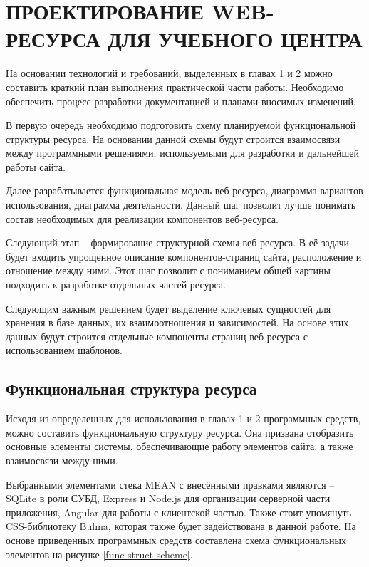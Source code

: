 \section{ПРОЕКТИРОВАНИЕ WEB-РЕСУРСА ДЛЯ УЧЕБНОГО ЦЕНТРА}

На основании технологий и требований, выделенных в главах 1 и 2 можно составить краткий план выполнения практической части работы.
Необходимо обеспечить процесс разработки документацией и планами вносимых изменений.

В первую очередь необходимо подготовить схему планируемой функциональной структуры ресурса.
На основании данной схемы будут строится взаимосвязи между программными решениями, используемыми для разработки и дальнейшей работы сайта.

Далее разрабатывается функциональная модель веб-ресурса, диаграмма вариантов использования, диаграмма деятельности.
Данный шаг позволит лучше понимать состав необходимых для реализации компонентов веб-ресурса.

Следующий этап -- формирование структурной схемы веб-ресурса.
В её задачи будет входить упрощенное описание компонентов-страниц сайта, расположение и отношение между ними.
Этот шаг позволит с пониманием общей картины подходить к разработке отдельных частей ресурса.

Следующим важным решением будет выделение ключевых сущностей для хранения в базе данных, их взаимоотношения и зависимостей.
На основе этих данных будут строится отдельные компоненты страниц веб-ресурса с использованием шаблонов.


\subsection{Функциональная структура ресурса}

Исходя из определенных для использования в главах 1 и 2 программных средств, можно составить функциональную структуру ресурса.
Она призвана отобразить основные элементы системы, обеспечивающие работу элементов сайта, а также взаимосвязи между ними.

Выбранными элементами стека MEAN с внесёнными правками являются -- SQLite в роли СУБД, Express и Node.js для организации серверной части приложения, Angular для работы с клиентской частью.
Также стоит упомянуть CSS-библиотеку Bulma, которая также будет задействована в данной работе.
На основе приведенных программных средств составлена схема функциональных элементов на рисунке \ref{func-struct-scheme}.



